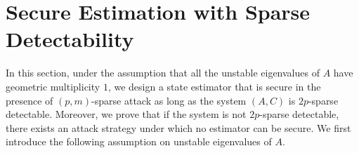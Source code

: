 \documentclass[12pt]{article}  %
\begin{document}

\section{Secure Estimation with Sparse Detectability}\label{sec:main_result}
In this section, under the assumption that all the unstable eigenvalues of $A$ have geometric multiplicity $1$, we design a state estimator that is secure in the presence of $(p,m)$-sparse attack as long as the system $(A,C)$ is $2p$-sparse detectable. Moreover, we prove that if the system is not $2p$-sparse detectable, there exists an attack strategy under which no estimator can be secure.
We first introduce the following assumption on unstable eigenvalues of $A$.
\end{document}
